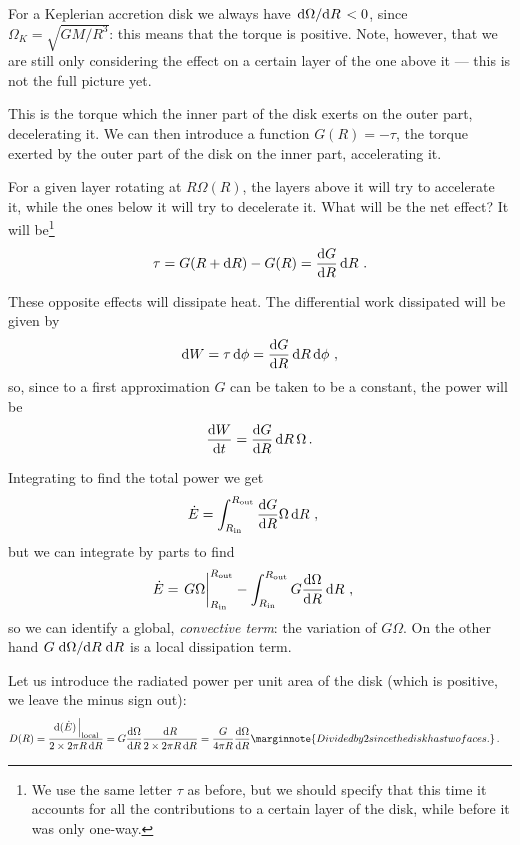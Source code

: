 \documentclass[main.tex]{subfiles}
\begin{document}
For a Keplerian accretion disk we always have \(\dv*{\Omega }{R} < 0\), since \(\Omega _K = \sqrt{GM / R^3}\): this means that the torque is positive.
Note, however, that we are still only considering the effect on a certain layer of the one above it --- this is not the full picture yet.

This is the torque which the inner part of the disk exerts on the outer part, decelerating it. 
We can then introduce a function \(G(R) = - \tau \), the torque exerted by the outer part of the disk on the inner part, accelerating it. 

For a given layer rotating at \(R \Omega (R)\), the layers above it will try to accelerate it, while the ones below it will try to decelerate it. What will be the net effect? It will be\footnote{We use the same letter \(\tau \) as before, but we should specify that this time it accounts for all the contributions to a certain layer of the disk, while before it was only one-way.}
%
\begin{align}
\tau =  G(R + \dd{R}) - G(R) = \dv{G}{R} \dd{R}
\,.
\end{align}

These opposite effects will dissipate heat. 
The differential work dissipated will be given by 
%
\begin{align}
\dd{W} = \tau \dd{\phi } = \dv{G}{R} \dd{R} \dd{\phi }
\,,
\end{align}
%
so, since to a first approximation \(G\) can be taken to be a constant, the power will be 
%
\begin{align}
\dv{W}{t} = \dv{G}{R} \dd{R} \Omega 
\,.
\end{align}

Integrating to find the total power we get
%
\begin{align}
\dot{E} &= \int_{R _{\text{in}}}^{R _{\text{out}} } \dv{G}{R} \Omega \dd{R} 
\,,
\end{align}
%
but we can integrate by parts to find 
%
\begin{align}
\dot{E} &= \eval{G \Omega }_{R _{\text{in}}}^{R _{\text{out}}}
- \int_{R _{\text{in}}}^{R _{\text{out}}} G \dv{\Omega }{R} \dd{R} 
\,,
\end{align}
%
so we can identify a global, \emph{convective term}: the variation of \(G \Omega \). On the other hand \(G \dv*{\Omega }{R} \dd{R}\) is a local dissipation term. 

Let us introduce the radiated power per unit area of the disk (which is positive, we leave the minus sign out):
%
\begin{align}
D(R) = \frac{ \eval{\dd{(\dot{E})}}_{\text{local}}}{2 \times 2 \pi R \dd{R}}
&= G \dv{\Omega }{R} \frac{ \dd{R}}{2 \times 2 \pi R \dd{R}} = \frac{G}{4 \pi R} \dv{\Omega }{R} \marginnote{Divided by 2 since the disk has two faces.} 
\,.
\end{align}
\end{document}
